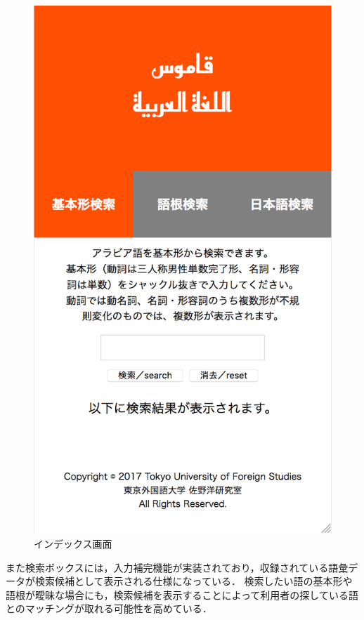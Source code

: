 \documentclass[technicalreport]{ieicej}
\begin{document}
\begin{figure}[H]
\begin{center}
\includegraphics[scale=0.4]{fig01.png}
\caption{インデックス画面}
\end{center}
\end{figure}

また検索ボックスには，入力補完機能が実装されており，収録されている語彙データが検索候補として表示される仕様になっている．
検索したい語の基本形や語根が曖昧な場合にも，検索候補を表示することによって利用者の探している語とのマッチングが取れる可能性を高めている．
\end{document}
